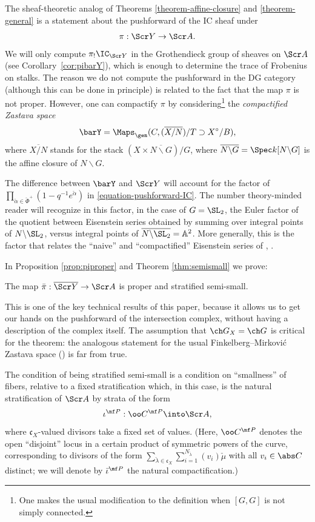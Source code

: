 The sheaf-theoretic analog of Theorems \ref{theorem-affine-closure} and \ref{theorem-general} is a statement about the pushforward of the IC sheaf under
\[ \pi: \Scr Y \to \Scr A.\]
We will only compute $\pi_! \IC_{\Scr Y}$ in the Grothendieck group of sheaves on $\Scr A$
(see Corollary~\ref{cor:pibarY}), which is enough to determine the trace of Frobenius on stalks.
The reason we do not compute the pushforward in the DG category (although this can be done in principle)
is related to the fact that the map $\pi$ is not proper.
However, one can compactify $\pi$ by considering\footnote{One makes the usual modification to the definition when $[G,G]$ is not simply connected.} the \emph{compactified Zastava space}
\[ \barY =   \Maps_\gen(C, (\overline{X/N})/T \supset X^\circ/B),  \]
where $\overline{X/N}$ stands for the stack $(X\times \overline{N\backslash G})/G$, where $\overline{N\backslash G}= \Spec k[N\backslash G]$ is the affine closure of $N\backslash G$.

The difference between $\barY$ and $\Scr Y$ will account for the factor of $\prod_{\check\alpha\in\check\Phi^+} (1-q^{-1} e^{\check\alpha})$ in \eqref{equation-pushforward-IC}. The number theory-minded reader will recognize in this factor, in the case of $G=\SL_2$, the Euler factor of the quotient between Eisenstein series obtained by summing over integral points of $N\backslash \SL_2$, versus integral points of $\overline{N\backslash \SL_2}=\mathbb A^2$. More generally, this is the factor that relates the ``naive'' and ``compactified'' Eisenstein series of \cite{BG}, \cite{BFGM}.



In Proposition \ref{prop:piproper} and Theorem \ref{thm:semismall} we prove:
\begin{thm}
\notready
\label{theorem-semismall}
 The map $\bar\pi: \overline{\Scr Y}\to \Scr A$ is proper and stratified semi-small.
\end{thm}
This is one of the key technical results of this paper, because it allows us to get our hands on the pushforward of the intersection complex, without having a description of the complex itself.
The assumption that $\ch G_X=\ch G$ is critical for the theorem: the analogous statement
for the usual Finkelberg--Mirkovi\'c Zastava space (\cite{FM,BFGM}) is far from true.

The condition of being stratified semi-small is a condition on ``smallness'' of fibers, relative to a fixed stratification which, in this case, is the natural stratification of $\Scr A$ by strata of the form
\[ \iota^{\mf P}: \oo C^{\mf P} \into \Scr A, \]
where $\mathfrak c_X$-valued divisors take a fixed set of values. (Here, $\oo C^{\mf P}$ denotes the open ``disjoint'' locus in a certain product of symmetric powers of the curve, corresponding to divisors of the form $\sum_{\check\lambda \in\mathfrak c_X} \sum_{i=1}^{N_{\check\lambda}} (v_i) \check\mu$ with all $v_i \in \abs C$ distinct; we will denote by $\bar\iota^{\mf P}$ the natural compactification.)



